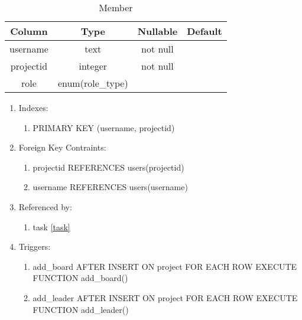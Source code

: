 \documentclass[conference,onecolumn]{IEEEtran}
\begin{document}
\begin{table}[htbp]
  \caption{Member}
  \begin{center}
    \begin{tabular}{|c|c|c|c|}
      \hline
      \textbf{Column} & \textbf{Type} & \textbf{Nullable} & \textbf{Default}\\
      \hline
      username & text & not null &\\
      projectid & integer & not null &\\
      role & enum(role\_type) &&\\
      \hline
    \end{tabular}
    \begin{enumerate}
    \item Indexes:
      \begin{enumerate}
      \item PRIMARY KEY (username, projectid)
      \end{enumerate}
    \item Foreign Key Contraints:
      \begin{enumerate}
      \item projectid REFERENCES users(projectid)
      \item username REFERENCES users(username)
      \end{enumerate}
    \item Referenced by:
      \begin{enumerate}
      \item task \ref{task}
      \end{enumerate}
    \item Triggers:
      \begin{enumerate}
        \item add\_board AFTER INSERT ON project FOR EACH ROW EXECUTE FUNCTION add\_board()
        \item add\_leader AFTER INSERT ON project FOR EACH ROW EXECUTE FUNCTION add\_leader()
      \end{enumerate}
    \end{enumerate}
    \label{member}
  \end{center}
\end{table}
\end{document}

